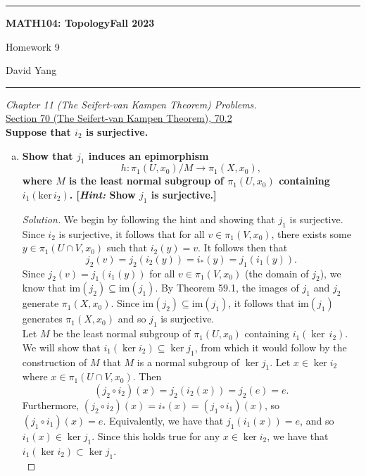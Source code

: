 \documentclass[11pt]{article}
\newenvironment{solution}
  {\renewcommand\qedsymbol{$\blacksquare$}\begin{proof}[Solution]}
  {\end{proof}}
\begin{document}
	\hrule
	\begin{center}
        \textbf{MATH104: Topology}\hfill \textbf{Fall 2023}\newline

		{\Large Homework 9}

		David Yang
	\end{center}

\hrule

\vspace{1em}

\textit{Chapter 11 (The Seifert-van Kampen Theorem) Problems.} \\

\underline{Section 70 (The Seifert-van Kampen Theorem), 70.2} \\

\textbf{Suppose that $i_2$ is surjective.}
\begin{enumerate}[a)]
    \item \textbf{Show that $j_1$ induces an epimorphism}
    \[
        h\colon \pi_1(U, x_0) / M \rightarrow \pi_1(X, x_0),
    \]
    \textbf{where $M$ is the least normal subgroup of $\pi_1(U, x_0)$ containing $i_1(\mathrm{ker} \, i_2)$. [\textit{Hint:} Show $j_1$ is surjective.]}

    \begin{solution}
    We begin by following the hint and showing that $j_1$ is surjective. Since $i_2$ is surjective, it follows that for all $v \in \pi_1(V, x_0)$, 
    there exists some $y \in \pi_1(U \cap V, x_0)$ such that $i_2(y) = v$. It follows then that
    \[
        j_2(v) = j_2(i_2(y)) = i_{\ast}(y) = j_1(i_1(y)).
    \]
    Since $j_2(v) = j_1(i_1(y))$ for all $v \in \pi_1(V, x_0)$ (the domain of $j_2$), we know that $\mathrm{im}(j_2) \subseteq \mathrm{im}(j_1)$. 
    By Theorem 59.1, the images of $j_1$ and $j_2$ generate $\pi_1(X, x_0)$. Since $\mathrm{im}(j_2) \subseteq \mathrm{im}(j_1)$, 
    it follows that $\mathrm{im}(j_1)$ generates $\pi_1(X, x_0)$ and so $j_1$ is surjective. \\

    Let $M$ be the least normal subgroup of $\pi_1(U, x_0)$ containing $i_1(\ker \, i_2)$. We will show that $i_1(\ker i_2) \subseteq \ker j_1$, 
    from which it would follow by the construction of $M$ that $M$ is a normal subgroup of $\ker j_1$. Let $x \in \ker i_2$ where $x \in \pi_1(U \cap V, x_0)$. 
    Then
    \[
        (j_2 \circ i_2)(x) = j_2(i_2(x)) = j_2(e) = e.
    \]
    Furthermore, $(j_2 \circ i_2)(x) = i_{\ast}(x) = (j_1 \circ i_1)(x)$, so $(j_1 \circ i_1)(x) = e$. Equivalently, we have that $j_1(i_1(x)) = e$, and so
    $i_1(x) \in \ker j_1$. Since this holds true for any $x \in \ker i_2$, we have that $i_1(\ker i_2) \subset \ker j_1$. \\


\end{solution}
\end{enumerate}
\end{document}

